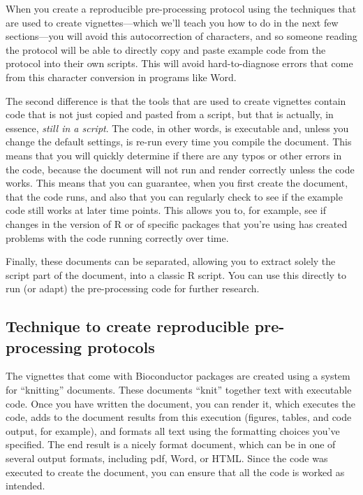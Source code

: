 \documentclass[]{tufte-book}
\begin{document}
When you create a reproducible pre-processing protocol using the techniques that
are used to create vignettes---which we'll teach you how to do in the next few
sections---you will avoid this autocorrection of characters, and so someone
reading the protocol will be able to directly copy and paste example code from
the protocol into their own scripts. This will avoid hard-to-diagnose errors
that come from this character conversion in programs like Word.

The second difference is that the tools that are used to create vignettes
contain code that is not just copied and pasted from a script, but that is
actually, in essence, \emph{still in a script}. The code, in other words, is
executable and, unless you change the default settings, is re-run every
time you compile the document. This means that you will quickly determine if
there are any typos or other errors in the code, because the document will
not run and render correctly unless the code works. This means that you can
guarantee, when you first create the document, that the code runs, and also
that you can regularly check to see if the example code still works at
later time points. This allows you to, for example, see if changes in the
version of R or of specific packages that you're using has created problems
with the code running correctly over time.

Finally, these documents can be separated, allowing you to extract solely the
script part of the document, into a classic R script. You can use this directly
to run (or adapt) the pre-processing code for further research.

\hypertarget{technique-to-create-reproducible-pre-processing-protocols}{%
\subsection{Technique to create reproducible pre-processing protocols}\label{technique-to-create-reproducible-pre-processing-protocols}}

The vignettes that come with Bioconductor packages are created using a system
for ``knitting'' documents. These documents ``knit'' together text with executable
code. Once you have written the document, you can render it, which executes the
code, adds to the document results from this execution (figures, tables, and
code output, for example), and formats all text using the formatting choices
you've specified. The end result is a nicely format document, which can be in
one of several output formats, including pdf, Word, or HTML. Since the code
was executed to create the document, you can ensure that all the code
is worked as intended.
\end{document}
